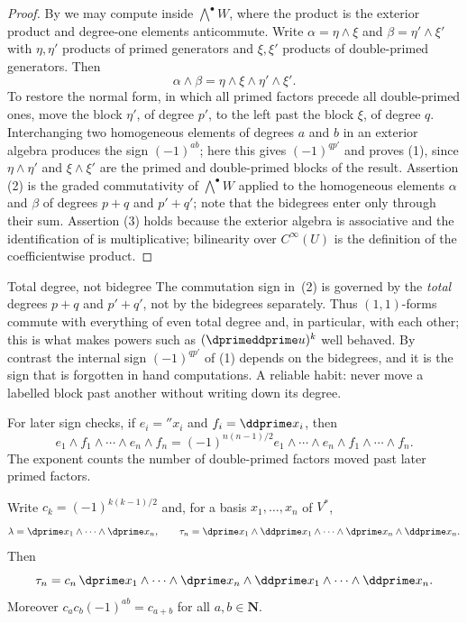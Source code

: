 \begin{proof}
By  we may compute inside
$\bigwedge^\bullet W$, where the product is the exterior product and
degree-one elements anticommute.  Write
$\alpha=\eta\wedge\xi$ and $\beta=\eta'\wedge\xi'$ with $\eta,\eta'$ products
of primed generators and $\xi,\xi'$ products of double-primed generators.
Then
\[
 \alpha\wedge\beta=\eta\wedge\xi\wedge\eta'\wedge\xi' .
\]
To restore the normal form, in which all primed factors precede all
double-primed ones, move the block $\eta'$, of degree $p'$, to the left past
the block $\xi$, of degree $q$.  Interchanging two homogeneous elements of
degrees $a$ and $b$ in an exterior algebra produces the sign $(-1)^{ab}$;
here this gives $(-1)^{qp'}$ and proves
(1), since $\eta\wedge\eta'$ and $\xi\wedge\xi'$
are the primed and double-primed blocks of the result.
Assertion (2) is the graded commutativity of
$\bigwedge^\bullet W$ applied to the homogeneous elements $\alpha$ and
$\beta$ of degrees $p+q$ and $p'+q'$; note that the bidegrees enter only
through their sum.  Assertion (3) holds because
the exterior algebra is associative and the identification of
 is multiplicative; bilinearity over
$C^\infty(U)$ is the definition of the coefficientwise product.
\end{proof}

\begin{warning}{Total degree, not bidegree}
The commutation sign in \,(2) is governed by the
\emph{total} degrees $p+q$ and $p'+q'$, not by the bidegrees separately.
Thus $(1,1)$-forms commute with everything of even total degree and, in
particular, with each other; this is what makes powers such as
$(\dprimeddprime u)^k$ well behaved.  By contrast the internal sign
$(-1)^{qp'}$ of (1) depends on the bidegrees, and
it is the sign that is forgotten in hand computations.  A reliable habit:
never move a labelled block past another without writing down its degree.
\end{warning}

For later sign checks, if $e_i=\dprime x_i$ and
$f_i=\ddprime x_i$, then
\[
 e_1\wedge f_1\wedge\cdots\wedge e_n\wedge f_n
 =(-1)^{n(n-1)/2}
 e_1\wedge\cdots\wedge e_n\wedge f_1\wedge\cdots\wedge f_n.
\]
The exponent counts the number of double-primed factors moved past later
primed factors.

\begin{lemma}
\label{lem:ch09-interlaced}
Write $c_k=(-1)^{k(k-1)/2}$ and, for a basis $x_1,\ldots,x_n$ of $V^*$,
\[
 \lambda=\dprime x_1\wedge\cdots\wedge\dprime x_n,
 \qquad
 \tau_n=\dprime x_1\wedge\ddprime x_1\wedge\cdots\wedge
        \dprime x_n\wedge\ddprime x_n .
\]
Then
\[
 \tau_n=c_n\,\dprime x_1\wedge\cdots\wedge\dprime x_n\wedge
              \ddprime x_1\wedge\cdots\wedge\ddprime x_n .
\]
Moreover $c_ac_b(-1)^{ab}=c_{a+b}$ for all $a,b\in\mathbf N$.
\end{lemma}

